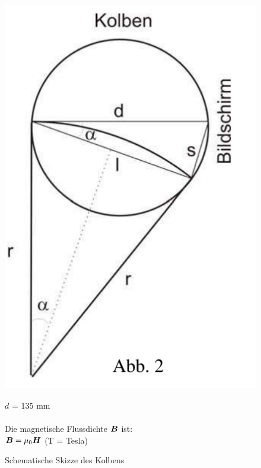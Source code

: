 \documentclass[ngerman]{scrartcl}
\begin{document}
\begin{figure}[H]
    \begin{minipage}[b]{0.35\linewidth}
        \centering
        \includegraphics[width=\linewidth]{fig/Kolben_skizze.png}
        \caption[Kolben Skizze]{Schematische Skizze des Kolbens}
        \label{fig:kolben_skizze}
    \end{minipage}%
    \hspace*{\fill}
    \begin{minipage}[b]{0.6\linewidth}
        $d$ = 135 mm\\ \\
        Die magnetische Flussdichte $\vb*{B}$ ist:\\
        $\vb*{B} = \mu_0 \vb*{H}$ (T = Tesla)\\

\end{minipage}
\end{figure}
\end{document}
